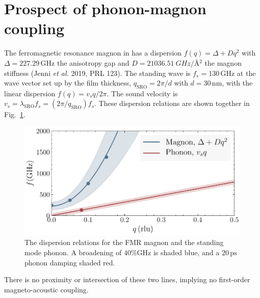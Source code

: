 \documentclass[nobib]{tufte-handout}
\begin{document}
\section{Prospect of phonon-magnon coupling}
The ferromagnetic resonance magnon in  has a dispersion \( f(q) = \Delta + Dq^2 \) with \( \Delta = 227.29\,\mathrm{GHz} \) the anisotropy gap and \( D = \SI{21036.51}{GHz/\angstrom^2} \) the magnon stiffness (Jenni \textit{et al.} 2019, PRL 123). The standing wave is \( f_s = 130\,\mathrm{GHz} \) at the wave vector set up by the film thickness, \( q_\mathrm{SRO} = 2\pi/d \) with \( d = 30\,\mathrm{nm} \), with the linear dispersion \( f(q) = v_s q/2\pi \). The sound velocity is \( v_s = \lambda_\mathrm{SRO}f_s = (2\pi/q_\mathrm{SRO})f_s \). These dispersion relations are shown together in Fig.~\ref{fig:magnon_phonon_disp}.
\begin{figure}
	\includegraphics[width=\linewidth]{Graphics/magnon_phonon_disp}
	\caption{The dispersion relations for the FMR magnon and the standing mode phonon. A broadening of \(40\%\mathrm{GHz} \) is shaded blue, and a \(20\,\mathrm{ps}\) phonon damping shaded red.}
	\label{fig:magnon_phonon_disp}
\end{figure}
There is no proximity or intersection of these two lines, implying no first-order magneto-acoustic coupling.
\end{document}
